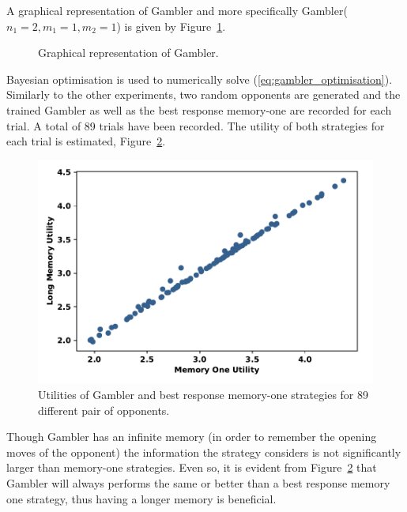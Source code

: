 \documentclass[10pt]{article}
\begin{document}
A graphical representation of Gambler and more specifically Gambler($n_1 = 2,
m_1 = 1, m_2 = 1$) is given by Figure~\ref{fig:gambler}.

\begin{figure}[!htbp]
    \centering
    
    \caption{Graphical representation of Gambler.}
    \label{fig:gambler}
\end{figure}

Bayesian optimisation is used to numerically solve
(\ref{eq:gambler_optimisation}). Similarly to the other experiments, two random
opponents are generated and the trained Gambler as well as the best response
memory-one are recorded for each trial. A total of 89 trials have been recorded.
The utility of both strategies for each trial is estimated,
Figure~\ref{fig:utilities_gambler_mem_one}.

\begin{figure}[!htbp]
    \centering
    \includegraphics[width=.55\textwidth]{img/gambler_performance_against_mem_one.pdf}
    \caption{Utilities of Gambler and best response memory-one strategies for
    89 different pair of opponents.}\label{fig:utilities_gambler_mem_one}
\end{figure}

Though Gambler has an infinite memory (in order to remember the opening moves of
the opponent) the information the strategy considers is not significantly larger
than memory-one strategies. Even so, it is evident from
Figure~\ref{fig:utilities_gambler_mem_one} that Gambler will always performs the
same or better than a best response memory one strategy, thus having a longer
memory is beneficial.

\end{document}
